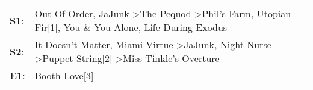 \begin{supertabular}{p{0.03\textwidth}p{0.92\textwidth}}
 \textbf{S1}:  &  Out Of Order\textsuperscript{}, \enspace JaJunk\textsuperscript{} \textgreater \enspace The Pequod\textsuperscript{} \textgreater \enspace Phil's Farm\textsuperscript{}, \enspace Utopian Fir[1]\textsuperscript{}, \enspace You \& You Alone\textsuperscript{}, \enspace Life During Exodus\textsuperscript{}  \enspace  \\
 \textbf{S2}:  &                      It Doesn't Matter\textsuperscript{}, \enspace Miami Virtue\textsuperscript{} \textgreater \enspace JaJunk\textsuperscript{}, \enspace Night Nurse\textsuperscript{} \textgreater \enspace Puppet String[2]\textsuperscript{} \textgreater \enspace Miss Tinkle's Overture\textsuperscript{}  \enspace  \\
 \textbf{E1}:  &                                                                                                                                                                                                                                                                                  Booth Love[3]\textsuperscript{}  \enspace  \\
\end{supertabular}
